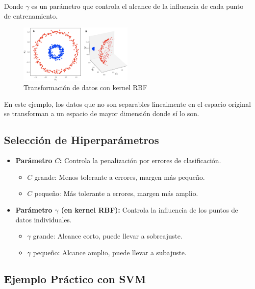 \documentclass[a4paper, 11pt]{article}
\begin{document}
Donde $\gamma$ es un parámetro que controla el alcance de la influencia de cada punto de entrenamiento.

\begin{figure}[h!]
    \centering
    \includegraphics[width=0.5\textwidth]{idea.png}
    \caption{Transformación de datos con kernel RBF}
\end{figure}

En este ejemplo, los datos que no son separables linealmente en el espacio original se transforman a un espacio de mayor dimensión donde sí lo son.


\subsection{Selección de Hiperparámetros}

\begin{itemize}
    \item \textbf{Parámetro $C$:} Controla la penalización por errores de clasificación.
    \begin{itemize}
        \item $C$ grande: Menos tolerante a errores, margen más pequeño.
        \item $C$ pequeño: Más tolerante a errores, margen más amplio.
    \end{itemize}
    \item \textbf{Parámetro $\gamma$ (en kernel RBF):} Controla la influencia de los puntos de datos individuales.
    \begin{itemize}
        \item $\gamma$ grande: Alcance corto, puede llevar a sobreajuste.
        \item $\gamma$ pequeño: Alcance amplio, puede llevar a subajuste.
    \end{itemize}
\end{itemize}

\subsection{Ejemplo Práctico con SVM}
\end{document}
